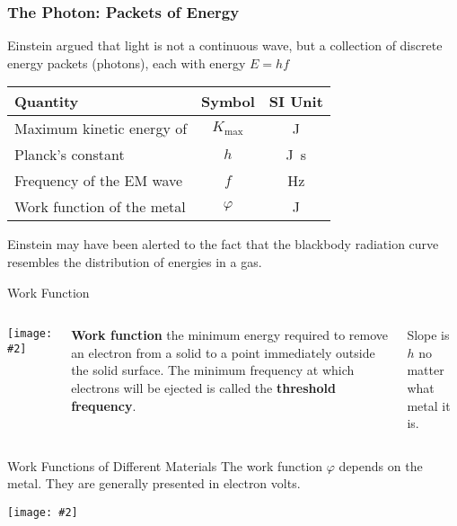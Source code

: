 \documentclass[12pt,compress,aspectratio=169]{beamer}
\newcommand{\pic}[2]{\texttt{[image: \#2]}}
\newcommand{\eq}[2]{\vspace{#1}{\Large\begin{displaymath}#2\end{displaymath}}}
\begin{document}
\begin{frame}
  \frametitle{The Photon: Packets of Energy}
  Einstein argued that light is not a continuous wave, but a collection of
  discrete energy packets (photons), each with energy $E=hf$

  \eq{-.2in}{
    \boxed{K_\mathrm{max}=
      \begin{cases}
        hf-\varphi & \text{if }hf>\varphi\\
        0          & \text{otherwise}
      \end{cases}
    }
  }
  \begin{center}
    \begin{tabular}{l|c|c}
      \rowcolor{pink}
      \textbf{Quantity} & \textbf{Symbol} & \textbf{SI Unit} \\ \hline
      Maximum kinetic energy of   & $K_\mathrm{max}$ & \si{\joule}\\
      Planck's constant           & $h$   & \si{\joule.\second}\\
      Frequency of the EM wave    & $f$   & \si{\hertz}\\
      Work function of the metal  & $\varphi$ & \si{\joule}
    \end{tabular}
  \end{center}
  Einstein may have been alerted to the fact that the blackbody radiation
  curve resembles the distribution of energies in a gas.
\end{frame}



\begin{frame}{Work Function}
  \begin{columns}
  \pic{1}{550px-Photoelectric_effect_diagram.png}
  
  \textbf{Work function} the minimum energy required to remove an electron
  from a solid to a point immediately outside the solid surface. The minimum
  frequency at which electrons will be ejected is called the
  \textbf{threshold frequency}.

  \vspace{.15in}Slope is $h$ no matter what metal it is.
  \end{columns}
\end{frame}



\begin{frame}{Work Functions of Different Materials}
  The work function $\varphi$ depends on the metal. They are generally presented
  in electron volts.
  \begin{center}
    \pic{.35}{work-function.png}
  \end{center}
\end{frame}
\end{document}
